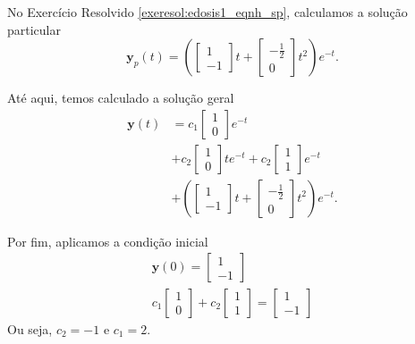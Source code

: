 \begin{resol}
  No Exercício Resolvido \ref{exeresol:edosis1_eqnh_sp}, calculamos a solução particular
  \begin{equation}
    \pmb{y}_p(t) = \left(
    \begin{bmatrix}
      1 \\
      -1
    \end{bmatrix}t +
    \begin{bmatrix}
      -\frac{1}{2} \\
      0
    \end{bmatrix}t^2\right)e^{-t}.
  \end{equation}

  Até aqui, temos calculado a solução geral
  \begin{align}
    \pmb{y}(t) &= c_1\begin{bmatrix}
    1 \\ 0
    \end{bmatrix}e^{-t} \\
    &+ c_2\begin{bmatrix}
    1 \\
    0
    \end{bmatrix}te^{-t} +
    c_2\begin{bmatrix}
    1 \\ 1
    \end{bmatrix}e^{-t} \\
    &+ \left(
    \begin{bmatrix}
      1 \\
      -1
    \end{bmatrix}t +
    \begin{bmatrix}
      -\frac{1}{2} \\
      0
    \end{bmatrix}t^2\right)e^{-t}.
  \end{align}

  Por fim, aplicamos a condição inicial
  \begin{gather}
    \pmb{y}(0) =
    \begin{bmatrix}
      1 \\ -1
    \end{bmatrix} \\
    c_1
    \begin{bmatrix}
      1\\ 0
    \end{bmatrix} + c_2
    \begin{bmatrix}
      1\\1
    \end{bmatrix} =     \begin{bmatrix}
      1 \\ -1
    \end{bmatrix}
  \end{gather}
  Ou seja, $c_2=-1$ e $c_1=2$.


\end{resol}
